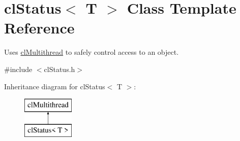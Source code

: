 \hypertarget{classcl_status}{
\section{clStatus$<$ T $>$ Class Template Reference}
\label{classcl_status}
}


Uses \hyperlink{classcl_multithread}{clMultithread} to safely control access to an object.  




{\ttfamily \#include $<$clStatus.h$>$}

Inheritance diagram for clStatus$<$ T $>$:\begin{figure}[H]
\begin{center}
\leavevmode
\includegraphics[height=2.000000cm]{classcl_status}
\end{center}
\end{figure}
